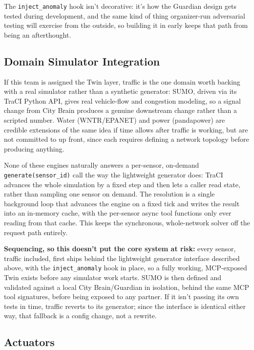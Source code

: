 \documentclass[10pt,letterpaper]{article}
\begin{document}
The \texttt{inject\_anomaly} hook isn't decorative: it's how the Guardian design gets tested during development, and the same kind of thing organizer-run adversarial testing will exercise from the outside, so building it in early keeps that path from being an afterthought.

\subsection{Domain Simulator Integration}

If this team is assigned the Twin layer, traffic is the one domain worth backing with a real simulator rather than a synthetic generator: SUMO, driven via its TraCI Python API, gives real vehicle-flow and congestion modeling, so a signal change from City Brain produces a genuine downstream change rather than a scripted number. Water (WNTR/EPANET) and power (pandapower) are credible extensions of the same idea if time allows after traffic is working, but are not committed to up front, since each requires defining a network topology before producing anything.

None of these engines naturally answers a per-sensor, on-demand \texttt{generate(sensor\_id)} call the way the lightweight generator does: TraCI advances the whole simulation by a fixed step and then lets a caller read state, rather than sampling one sensor on demand. The resolution is a single background loop that advances the engine on a fixed tick and writes the result into an in-memory cache, with the per-sensor async tool functions only ever reading from that cache. This keeps the synchronous, whole-network solver off the request path entirely.

\textbf{Sequencing, so this doesn't put the core system at risk:} every sensor, traffic included, first ships behind the lightweight generator interface described above, with the \texttt{inject\_anomaly} hook in place, so a fully working, MCP-exposed Twin exists before any simulator work starts. SUMO is then defined and validated against a local City Brain/Guardian in isolation, behind the same MCP tool signatures, before being exposed to any partner. If it isn't passing its own tests in time, traffic reverts to its generator; since the interface is identical either way, that fallback is a config change, not a rewrite.

\subsection{Actuators}
\end{document}
